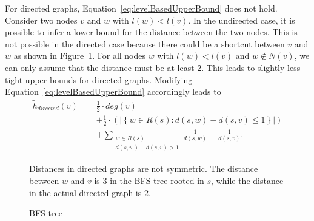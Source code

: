 For directed graphs, Equation~\ref{eq:levelBasedUpperBound} does not hold. Consider two nodes $v$ and $w$ with $l(w) < l(v)$. In the undirected case, it is possible to infer a lower bound for the distance between the two nodes. This is not possible in the directed case because there could be a shortcut between $v$ and $w$ as shown in Figure~\ref{fig:directedBFSbound}. For all nodes $w$ with $l(w) < l(v)$ and $w \notin N(v)$, we can only assume that the distance must be at least $2$. This leads to slightly less tight upper bounds for directed graphs. Modifying Equation~\ref{eq:levelBasedUpperBound} accordingly leads to
\begin{align}
     \widetilde{h}_{directed}(v) ={} &\frac{1}{2} \cdot deg(v) \nonumber \\
      &+ \frac{1}{2} \cdot \left( \left|\left\{ w \in R(s) : d(s, w) - d(s, v) \leq 1 \right\} \right| \right) \nonumber \\
      &+ \sum_{\substack{w \in R(s) \\ d(s, w) - d(s, v) > 1}}{\frac{1}{d(s, w)} - \frac{1}{d(s, v)}}. \label{eq:levelBasedUpperBoundDirected} 
\end{align}



\begin{figure}[h!]
\centering
{}
\caption{BFS tree}{Distances in directed graphs are not symmetric. The distance between $w$ and $v$ is $3$ in the BFS tree rooted in $s$, while the distance in the actual directed graph is $2$.}
\label{fig:directedBFSbound}
\end{figure}

